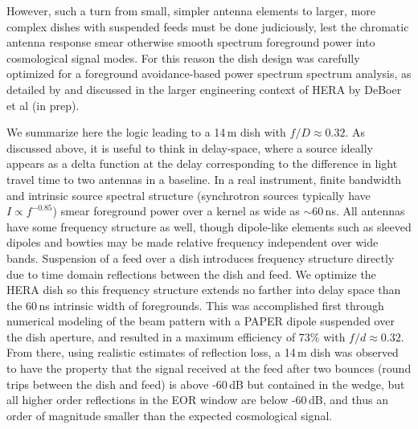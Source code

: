 \documentclass{emulateapj}
\begin{document}
However, such a turn from small, simpler antenna elements to larger, more complex dishes with 
suspended feeds must be done judiciously, lest the chromatic antenna response smear otherwise 
smooth spectrum foreground power into cosmological signal modes. For this reason the dish 
design was carefully optimized for a foreground avoidance-based power spectrum spectrum 
analysis, as detailed by \citet{heraMemo5} and discussed in the larger engineering context of 
HERA by DeBoer et al (in prep). 

We summarize here the logic leading to a 14\,m dish with $f/D\approx0.32$. As discussed 
above, it is useful to think in delay-space, where a source ideally appears as a delta function 
at the delay corresponding to the difference in light travel time to two antennas in a 
baseline. In a real instrument, finite bandwidth and intrinsic source spectral structure 
(synchrotron sources typically have $I\propto f^{-0.85}$) smear foreground power over a 
kernel as wide as $\sim60$\,ns. All antennas have some frequency structure as well, though 
dipole-like elements such as sleeved dipoles and bowties may be made relative frequency 
independent over wide bands. Suspension of a feed over a dish introduces frequency 
structure directly due to time domain reflections between the dish and feed. We optimize the 
HERA dish so this frequency structure extends no farther into delay space than the 60\,ns 
intrinsic width of foregrounds. This was accomplished first through numerical modeling of 
the beam pattern with a PAPER dipole suspended over the dish aperture, and resulted in a 
maximum efficiency of 73\% with $f/d\approx0.32$. From there, using realistic estimates of 
reflection loss, a 14\,m dish was observed to have the property that the signal received at the 
feed after two bounces (round trips between the dish and feed) is above -60\,dB but 
contained in the wedge, but all higher order reflections in the EOR window are below 
-60\,dB, and thus an order of magnitude smaller than the expected cosmological signal. 
\end{document}
